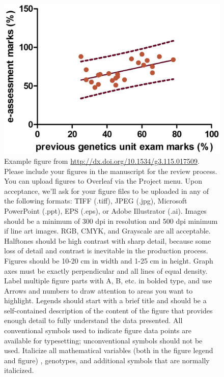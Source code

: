 \documentclass[9pt,twocolumn,twoside]{g3_article/gsag3jnl}
\begin{document}
\begin{figure}[htbp]
\renewcommand{\familydefault}{\sfdefault}\normalfont
\centering
\includegraphics[width=\linewidth]{images/example-figure-g3}
\caption{Example figure from \url{http://dx.doi.org/10.1534/g3.115.017509}. Please include your figures in the 
    manuscript for the review process. You can upload figures to Overleaf via the Project menu. Upon acceptance, 
    we'll ask for your figure files to be uploaded in any of the following formats: TIFF (.tiff), JPEG (.jpg), 
    Microsoft PowerPoint (.ppt), EPS (.eps), or Adobe Illustrator (.ai).  Images should be a minimum of 
    300 dpi in resolution and 500 dpi minimum if line art images.  RGB, CMYK, and Grayscale are all 
    acceptable. Halftones should be high contrast with sharp detail, because some loss of detail and 
    contrast is inevitable in the production process. Figures should be 10-20 cm in width and 1-25 cm 
    in height. Graph axes must be exactly perpendicular and all lines of equal density.  Label 
    multiple figure parts with A, B, etc. in bolded type, and use Arrows and numbers to draw attention 
    to areas you want to highlight. Legends should start with a brief title and should be a 
    self-contained description of the content of the figure that provides enough detail to fully 
    understand the data presented. All conventional symbols used to indicate figure data points are 
    available for typesetting; unconventional symbols should not be used. Italicize all mathematical 
    variables (both in the figure legend and figure) , genotypes, and additional symbols that 
    are normally italicized.  
}%
\label{fig:spectrum}
\end{figure}
\end{document}
